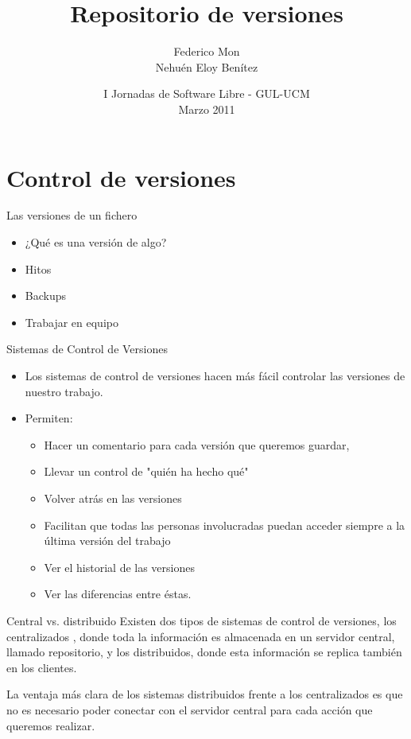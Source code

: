 \documentclass[spanish]{beamer}
\title[Repositorio de versiones- GUL-UCM]
{Repositorio de versiones
}
\author[\url{http://gulucm.org}]
{
Federico Mon \\
Nehuén Eloy Benítez
}
\institute{Facultad de Informática.\\Universidad Complutense de Madrid.}
\date{
I Jornadas de Software Libre - GUL-UCM\\
Marzo 2011}
\begin{document}
    \frame{\titlepage}
    \section{Control de versiones}
        \begin{frame}{Las versiones de un fichero}
         \begin{itemize}
	\item ¿Qué es una versión de algo?
	\item Hitos
	\item Backups
	\item Trabajar en equipo
         \end{itemize}
       \end{frame} 


        \begin{frame}{Sistemas de Control de Versiones}
         \begin{itemize}
       \item Los sistemas de control de versiones hacen más fácil controlar las 
        versiones de nuestro trabajo.
       \item Permiten:
         \begin{itemize}
	\item Hacer un comentario para cada versión que queremos
         guardar,
        \item Llevar un control de "quién ha hecho qué"
	\item Volver atrás en las versiones
        \item Facilitan que todas las personas involucradas 
        puedan acceder siempre a la última versión del trabajo
	\item Ver el historial de las versiones
	\item Ver las diferencias entre éstas.
       \end{itemize} 
       \end{itemize} 
       \end{frame} 
        
        \begin{frame}{Central vs. distribuido}
        Existen dos tipos de sistemas de control de versiones, los centralizados
        , donde toda la información es almacenada en un servidor central, 
        llamado repositorio, y los distribuidos, donde esta información se 
        replica también en los clientes.
        
        La ventaja más clara de los sistemas distribuidos frente a los 
        centralizados es que no es necesario poder conectar con el servidor 
        central para cada acción que queremos realizar.
       \end{frame} 
       
\end{document}
